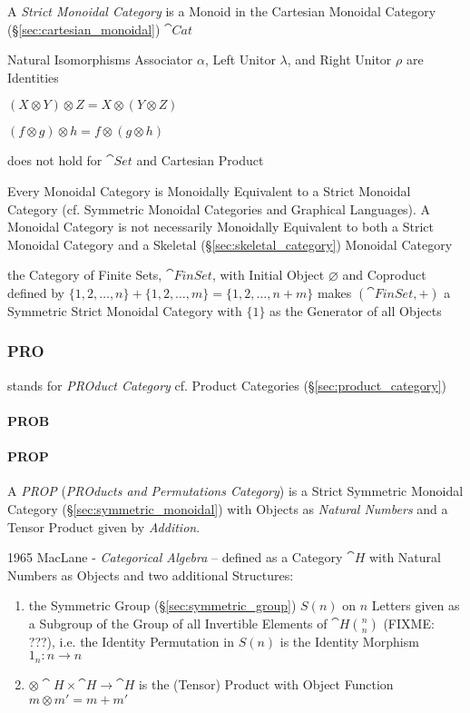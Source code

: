 A \emph{Strict Monoidal Category} is a Monoid in the Cartesian
Monoidal Category (\S\ref{sec:cartesian_monoidal}) $\cat{Cat}$

Natural Isomorphisms Associator $\alpha$, Left Unitor $\lambda$, and
Right Unitor $\rho$ are Identities

$(X \otimes Y) \otimes Z = X \otimes (Y \otimes Z)$

$(f \otimes g) \otimes h = f \otimes (g \otimes h)$

does not hold for $\cat{Set}$ and Cartesian Product

Every Monoidal Category is Monoidally Equivalent to a Strict Monoidal
Category (cf. Symmetric Monoidal Categories and Graphical Languages).
A Monoidal Category is not necessarily Monoidally Equivalent to both a
Strict Monoidal Category and a Skeletal
(\S\ref{sec:skeletal_category}) Monoidal Category

the Category of Finite Sets, $\cat{FinSet}$, with Initial Object $\varnothing$
and Coproduct defined by $\{1,2,\ldots,n\} + \{1,2,\ldots,m\} =
\{1,2,\ldots,n+m\}$ makes $(\cat{FinSet}, +)$ a
Symmetric Strict Monoidal Category with $\{1\}$ as the Generator of all Objects



\subsubsection{PRO}\label{sec:pro_category}

stands for \emph{PROduct Category} \fist cf. Product Categories
(\S\ref{sec:product_category})



\paragraph{PROB}\label{sec:prob_category}\hfill

\paragraph{PROP}\label{sec:prop_category}\hfill

A \emph{PROP} (\emph{PROducts and Permutations Category}) is a Strict Symmetric
Monoidal Category (\S\ref{sec:symmetric_monoidal}) with Objects as
\emph{Natural Numbers} and a Tensor Product given by \emph{Addition}.

1965 MacLane - \emph{Categorical Algebra} -- defined as a Category $\cat{H}$
with Natural Numbers as Objects and two additional Structures:
\begin{enumerate}
  \item the Symmetric Group (\S\ref{sec:symmetric_group}) $S(n)$ on $n$ Letters
    given as a Subgroup of the Group of all Invertible Elements of
    $\cat{H}\binom{n}{n}$ (FIXME: ???), i.e. the Identity Permutation in $S(n)$
    is the Identity Morphism $1_n : n \rightarrow n$
  \item $\otimes \cat{H} \times \cat{H} \rightarrow \cat{H}$ is the (Tensor)
    Product with Object Function $m \otimes m' = m + m'$
\end{enumerate}

